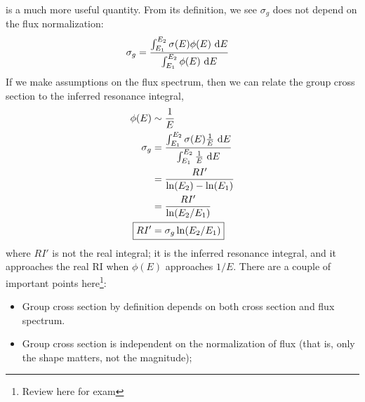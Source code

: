\documentclass{school-22.211-notes}
\begin{document}
 is a much more useful quantity. From its definition, we see $\sigma_g$ does not depend on the flux normalization: 
\begin{align}
\sigma_g &= \frac{\int_{E_1}^{E_2} \sigma(E) \phi(E) \mbox{ }\mathrm{d} E }{\int_{E_1}^{E_2} \phi(E) \mbox{ }\mathrm{d} E} 
\end{align}
If we make assumptions on the flux spectrum, then we can relate the group cross section to the inferred resonance integral,
\begin{align}
\phi(E) &\sim \frac{1}{E} \\
\sigma_g &= \frac{\int_{E_1}^{E_2} \sigma(E) \frac{1}{E} \dE }{\int_{E_1}^{E_2} \frac{1}{E} \dE} \\
&= \frac{RI'}{\ln(E_2) - \ln(E_1)}  \\
&= \frac{RI'}{\ln(E_2/E_1)} \\
\Aboxed{ RI' &= \sigma_g \ln(E_2/E_1) }
\end{align}
where $RI'$ is not the real integral; it is the inferred resonance integral, and it approaches the real RI when $\phi(E)$ approaches $1/E$. There are a couple of important points here\footnote{Review here for exam}:
\begin{itemize}
\item Group cross section by definition depends on both cross section and flux spectrum. 
\item Group cross section is independent on the normalization of flux (that is, only the shape matters, not the magnitude);
\end{itemize}
\end{document}
